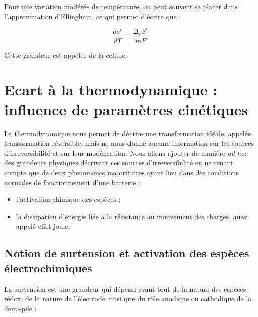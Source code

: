 Pour une variation modérée de température, on peut souvent se placer dans l'approximation d'Ellingham, ce qui permet d'écrire que : 

\begin{equation}
\frac{d e^\circ}{dT} = \frac{\Delta_r S^\circ}{mF}
\end{equation}

Cette grandeur est appelée  de la cellule.

\section{Ecart à la thermodynamique : influence de paramètres cinétiques}

La thermodynamique nous permet de décrire une transformation idéale, appelée transformation réversible, mais ne nous donne aucune information sur les sources d'irreversibilité et sur leur modélisation. Nous allons ajouter de manière \emph{ad hoc} des grandeurs physiques décrivant ces sources d'irreversibilité en ne tenant compte que de deux phenomènes majoritaires ayant lieu dans des conditions normales de fonctionnement d'une batterie : 

\begin{itemize}
\item l'activation chimique des espèces ;
\item la dissipation d'énergie liée à la résistance au mouvement des charges, aussi appelé effet joule.
\end{itemize}

\subsection{Notion de surtension et activation des espèces électrochimiques}


La surtension est une grandeur qui dépend avant tout de la nature des espèces rédox, de la nature de l'électrode ainsi que du rôle anodique ou cathodique de la demi-pile : 

